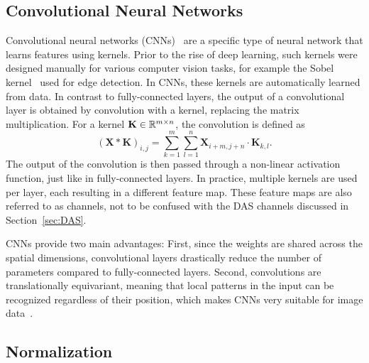 \subsection{Convolutional Neural Networks}

Convolutional neural networks (CNNs)~\cite{CNN} are a specific type of neural network that learns features using kernels.
Prior to the rise of deep learning, such kernels were designed manually for various computer vision tasks, for example the Sobel kernel~\cite{Sobel} used for edge detection.
In CNNs, these kernels are automatically learned from data. In contrast to fully-connected layers, the output of a convolutional layer is obtained by convolution with a kernel, replacing the matrix multiplication.
For a kernel $\mathbf{K} \in \mathbb{R}^{m \times n}$, the convolution is defined as
\begin{equation}
    (\mathbf{X} \ast \mathbf{K})_{i,j} = \sum_{k=1}^{m}\sum_{l=1}^{n} \mathbf{X}_{i+m,j+n} \cdot \mathbf{K}_{k,l}.
\end{equation}
The output of the convolution is then passed through a non-linear activation function, just like in fully-connected layers.
In practice, multiple kernels are used per layer, each resulting in a different feature map.
These feature maps are also referred to as channels, not to be confused with the DAS channels discussed in Section~\ref{sec:DAS}.

CNNs provide two main advantages: First, since the weights are shared across the spatial dimensions, convolutional layers drastically reduce the number of parameters compared to fully-connected layers. 
Second, convolutions are translationally equivariant, meaning that local patterns in the input can be recognized regardless of their position, which makes CNNs very suitable for image data~\cite{DeepLearning}.

\subsection{Normalization}

